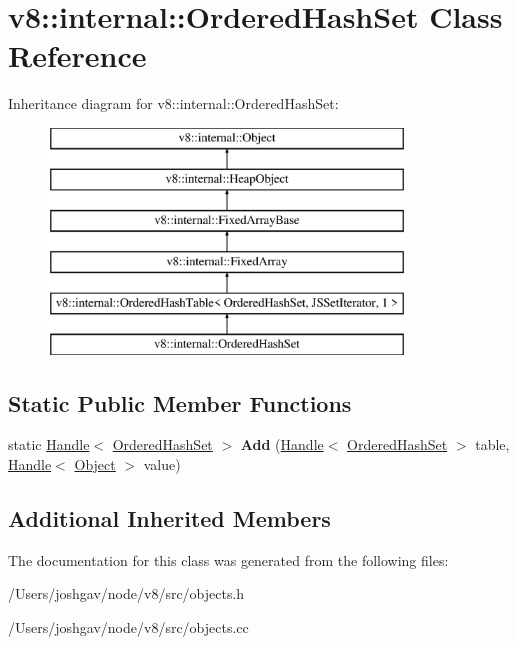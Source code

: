 \hypertarget{classv8_1_1internal_1_1_ordered_hash_set}{}\section{v8\+:\+:internal\+:\+:Ordered\+Hash\+Set Class Reference}
\label{classv8_1_1internal_1_1_ordered_hash_set}
Inheritance diagram for v8\+:\+:internal\+:\+:Ordered\+Hash\+Set\+:\begin{figure}[H]
\begin{center}
\leavevmode
\includegraphics[height=6.000000cm]{classv8_1_1internal_1_1_ordered_hash_set}
\end{center}
\end{figure}
\subsection*{Static Public Member Functions}
\begin{DoxyCompactItemize}
\item 
static \hyperlink{classv8_1_1internal_1_1_handle}{Handle}$<$ \hyperlink{classv8_1_1internal_1_1_ordered_hash_set}{Ordered\+Hash\+Set} $>$ {\bfseries Add} (\hyperlink{classv8_1_1internal_1_1_handle}{Handle}$<$ \hyperlink{classv8_1_1internal_1_1_ordered_hash_set}{Ordered\+Hash\+Set} $>$ table, \hyperlink{classv8_1_1internal_1_1_handle}{Handle}$<$ \hyperlink{classv8_1_1internal_1_1_object}{Object} $>$ value)\hypertarget{classv8_1_1internal_1_1_ordered_hash_set_abb0b692fed5491b61bb5df979ccbd82f}{}\label{classv8_1_1internal_1_1_ordered_hash_set_abb0b692fed5491b61bb5df979ccbd82f}

\end{DoxyCompactItemize}
\subsection*{Additional Inherited Members}


The documentation for this class was generated from the following files\+:\begin{DoxyCompactItemize}
\item 
/\+Users/joshgav/node/v8/src/objects.\+h\item 
/\+Users/joshgav/node/v8/src/objects.\+cc\end{DoxyCompactItemize}
